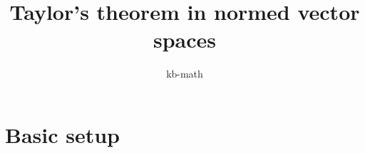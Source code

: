 \documentclass[twoside, a4paper, 10pt]{amsart}
\title[ ]{Taylor's theorem in normed vector spaces}
\author{kb-math}
\begin{document}
\maketitle
\raggedbottom


\newcommand{\cA}{\mathcal{A}}
\newcommand{\cB}{\mathcal{B}}
\newcommand{\cC}{\mathcal{C}}
\newcommand{\cD}{\mathcal{D}}
\newcommand{\cE}{\mathcal{E}}
\newcommand{\cF}{\mathcal{F}}
\newcommand{\cG}{\mathcal{G}}
\newcommand{\cH}{\mathcal{H}}
\newcommand{\cI}{\mathcal{I}}
\newcommand{\cJ}{\mathcal{J}}
\newcommand{\cK}{\mathcal{K}}
\newcommand{\cL}{\mathcal{L}}
\newcommand{\cM}{\mathcal{M}}
\newcommand{\cN}{\mathcal{N}}
\newcommand{\cO}{\mathcal{O}}
\newcommand{\cP}{\mathcal{P}}
\newcommand{\cQ}{\mathcal{Q}}
\newcommand{\cR}{\mathcal{R}}
\newcommand{\cS}{\mathcal{S}}
\newcommand{\cT}{\mathcal{T}}
\newcommand{\cU}{\mathcal{U}}
\newcommand{\cV}{\mathcal{V}}
\newcommand{\cW}{\mathcal{W}}
\newcommand{\cX}{\mathcal{X}}
\newcommand{\cY}{\mathcal{Y}}
\newcommand{\cZ}{\mathcal{Z}}
\newcommand{\bA}{\mathbb{A}}
\newcommand{\bB}{\mathbb{B}}
\newcommand{\bC}{\mathbb{C}}
\newcommand{\bD}{\mathbb{D}}
\newcommand{\bE}{\mathbb{E}}
\newcommand{\bF}{\mathbb{F}}
\newcommand{\bG}{\mathbb{G}}
\newcommand{\bH}{\mathbb{H}}
\newcommand{\bI}{\mathbb{I}}
\newcommand{\bJ}{\mathbb{J}}
\newcommand{\bK}{\mathbb{K}}
\newcommand{\bL}{\mathbb{L}}
\newcommand{\bM}{\mathbb{M}}
\newcommand{\bN}{\mathbb{N}}
\newcommand{\bO}{\mathbb{O}}
\newcommand{\bP}{\mathbb{P}}
\newcommand{\bQ}{\mathbb{Q}}
\newcommand{\bR}{\mathbb{R}}
\newcommand{\bS}{\mathbb{S}}
\newcommand{\bT}{\mathbb{T}}
\newcommand{\bU}{\mathbb{U}}
\newcommand{\bV}{\mathbb{V}}
\newcommand{\bW}{\mathbb{W}}
\newcommand{\bX}{\mathbb{X}}
\newcommand{\bY}{\mathbb{Y}}
\newcommand{\bZ}{\mathbb{Z}}


 

\theoremstyle{definition}
\newtheorem{mydef}[dummy]{Definition}
\newtheorem{prop}[dummy]{Proposition}
\newtheorem{corol}[dummy]{Corollary}
\newtheorem{thm}[dummy]{Theorem}
\newtheorem{lemma}[dummy]{Lemma}
\newtheorem{eg}[dummy]{Example}
\newtheorem{notation}[dummy]{Notation}
\newtheorem{remark}[dummy]{Remark}
\newtheorem{claim}[dummy]{Claim}
\newtheorem{Exercise}[dummy]{Exercise}
\newtheorem{question}[dummy]{Question}

\section{Basic setup}
\end{document}
